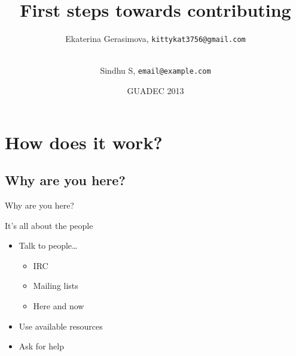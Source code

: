 \documentclass{beamer}
\title%
{First steps towards contributing}
\author
{Ekaterina Gerasimova, \texttt{kittykat3756@gmail.com} \and \\Sindhu S, \texttt{email@example.com}}
\date%
{GUADEC 2013}
\begin{document}
\begin{frame}
  \titlepage
\end{frame}






\section{How does it work?}

\subsection{Why are you here?}

\begin{frame}{Why are you here?}%
\end{frame}

\begin{frame}{It's all about the people}
  \begin{itemize}
  \item
    Talk to people\ldots
    \begin{itemize}
    \item
      IRC
    \item
      Mailing lists
    \item
      Here and now
    \end{itemize}
  \item
    Use available resources
  \item
    Ask for help
  \end{itemize}
\end{frame}
\end{document}
